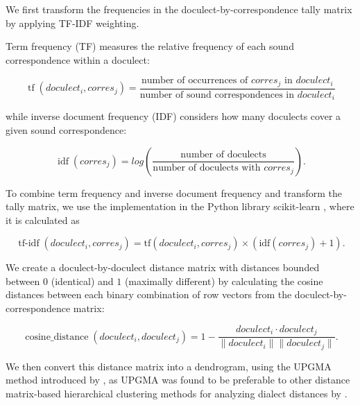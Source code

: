 \documentclass[a4paper]{article}
\begin{document}
We first transform the frequencies
in the doculect-by-correspondence tally matrix
by applying TF-IDF weighting.


Term frequency (TF) measures the relative frequency
of each sound correspondence within a doculect:

\begin{equation*}
\operatorname{tf}(doculect_i, corres_j) =
\frac{\text{number of occurrences of } corres_j \text{ in } doculect_i}
{\text{number of sound correspondences in } doculect_i}
\end{equation*}

while inverse document frequency (IDF)
considers how many doculects cover a given
sound correspondence:

\begin{equation*}
\operatorname{idf}(corres_j) =
log(
\frac{\text{number of doculects}}
{\text{number of doculects with } corres_j}
).
\end{equation*}

To combine term frequency and inverse document frequency
and transform the tally matrix, 
we use the implementation in the Python library scikit-learn
\citep{pedregosa2011scikit-learn},
where it is calculated as

\begin{equation*}
\operatorname{tf-idf}(doculect_i, corres_j) =
\text{tf}(doculect_i, corres_j)
\times
(
\text{idf}(corres_j)
+ 1).
\end{equation*}


We create a doculect-by-doculect distance matrix
with distances bounded between $0$ (identical) and $1$ (maximally different)
by calculating the cosine distances between each
binary combination of row vectors from the doculect-by-correspondence matrix:

\begin{equation*}
\operatorname{cosine\_distance}(doculect_i,doculect_j) =
1 -
\frac{doculect_i \cdot doculect_j}{\lVert doculect_i \rVert \lVert doculect_j \rVert}
.
\end{equation*}

We then convert this distance matrix into a dendrogram,
using the UPGMA method introduced by \citet{sokal1958statistical},
as UPGMA was found to be preferable to other
distance matrix-based hierarchical clustering methods
for analyzing dialect distances by \citet{heeringa2004measuring}.
\end{document}
